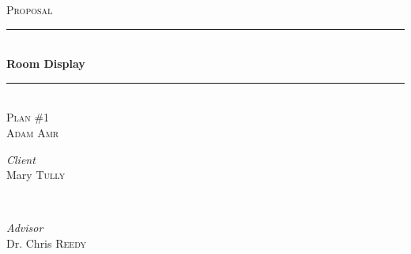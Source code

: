 \documentclass[12pt]{article}
\begin{document}
\begin{titlepage} %
	\newcommand{\HRule}{\rule{\linewidth}{0.5mm}} %
	
	\center %
	
	
	\textsc{\LARGE Proposal}\\[1.5cm] %
		
	\HRule\\[0.4cm]
	
	{\huge\bfseries Room Display}\\[0.4cm] %
	
	\HRule\\[1.5cm]
	
	
	\textsc{\Large Plan \#1}\\[0.5cm] %
	
	\textsc{\large Adam Amr}\\[0.5cm] %
	
	
	\begin{minipage}{0.4\textwidth}
		\begin{flushleft}
			\large
			\textit{Client}\\
			Mary \textsc{Tully} %
		\end{flushleft}
	\end{minipage}
	~
	\begin{minipage}{0.4\textwidth}
		\begin{flushright}
			\large
			\textit{Advisor}\\
			Dr. Chris \textsc{Reedy} %
		\end{flushright}
	\end{minipage}
	
	
	

\end{titlepage}
\end{document}
